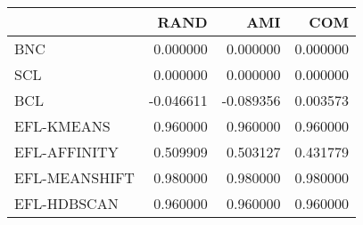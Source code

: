 \begin{tabular}{lrrr}
\toprule
 & RAND & AMI & COM \\
\midrule
BNC & 0.000000 & 0.000000 & 0.000000 \\
SCL & 0.000000 & 0.000000 & 0.000000 \\
BCL & -0.046611 & -0.089356 & 0.003573 \\
EFL-KMEANS & 0.960000 & 0.960000 & 0.960000 \\
EFL-AFFINITY & 0.509909 & 0.503127 & 0.431779 \\
EFL-MEANSHIFT & 0.980000 & 0.980000 & 0.980000 \\
EFL-HDBSCAN & 0.960000 & 0.960000 & 0.960000 \\
\bottomrule
\end{tabular}
